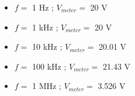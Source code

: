 \begin{itemize}
\item{} $f =$ 1 Hz ; $V_{meter} =$ 20 V
\item{} $f =$ 1 kHz ; $V_{meter} =$ 20 V
\item{} $f =$ 10 kHz ; $V_{meter} =$ 20.01 V
\item{} $f =$ 100 kHz ; $V_{meter} =$ 21.43 V
\item{} $f =$ 1 MHz ; $V_{meter} =$ 3.526 V
\end{itemize}









